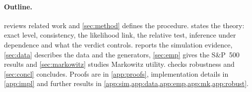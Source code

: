 \paragraph{Outline.}
 reviews related work and \cref{sec:method} defines the procedure. 
states the theory: exact level, consistency, the likelihood link, the relative test, inference
under dependence and what the verdict controls.  reports the simulation evidence,
\cref{sec:data} describes the data and the generators, \cref{sec:emp} gives the S\&P~500 results
and \cref{sec:markowitz} studies Markowitz utility.  checks robustness and
\cref{sec:concl} concludes. Proofs are in \cref{app:proofs}, implementation details in
\cref{app:impl} and further results in \cref{app:sim,app:data,app:emp,app:mk,app:robust}.
